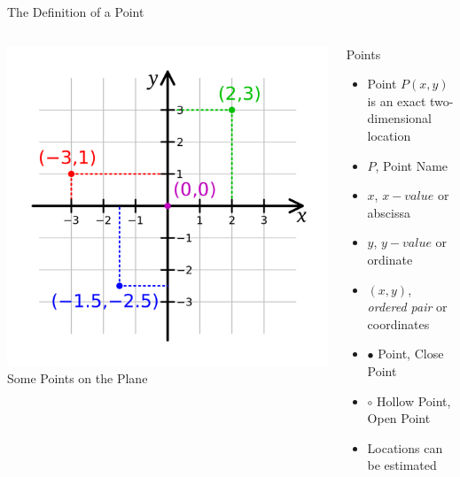 \documentclass[14pt,aspectratio=169]{beamer}
\begin{document}
\begin{frame}{The Definition of a Point}
  \begin{columns}
   \centering
    \includegraphics[width=1\textwidth]{image03}\\Some Points on the Plane
    \begin{block}{Points}
     \begin{itemize}
      \item Point $P(x,y)$ is an exact two-dimensional location
      \item $P$, Point Name
      \item $x$, $x-value$ or abscissa
      \item $y$, $y-value$ or ordinate
      \item $(x,y)$, \textit{ordered pair} or coordinates
      \item $\bullet$ Point, Close Point
      \item $\circ$ Hollow Point, Open Point
      \item Locations can be estimated

     \end{itemize}

    \end{block}


  \end{columns}

\end{frame}
\end{document}
